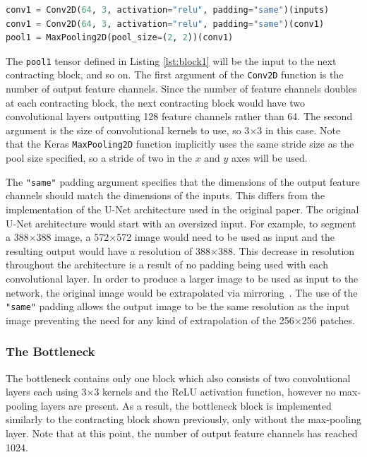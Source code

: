 \begin{lstlisting}[float={!t},caption={IThe implementation of the first contracting block of the U-Net architecture using the Keras functional API.},label={lst:block1},language=Python,upquote=true,belowskip=0pt]
conv1 = Conv2D(64, 3, activation="relu", padding="same")(inputs)
conv1 = Conv2D(64, 3, activation="relu", padding="same")(conv1)
pool1 = MaxPooling2D(pool_size=(2, 2))(conv1)
\end{lstlisting}
The \texttt{pool1} tensor defined in Listing \ref{lst:block1} will be the input to the next contracting block, and so on. The first argument of the \texttt{Conv2D} function is the number of output feature channels. Since the number of feature channels doubles at each contracting block, the next contracting block would have two convolutional layers outputting 128 feature channels rather than 64. The second argument is the size of convolutional kernels to use, so 3$\times$3 in this case. Note that the Keras \texttt{MaxPooling2D} function implicitly uses the same stride size as the pool size specified, so a stride of two in the $x$ and $y$ axes will be used.

The \texttt{"{}same"{}} padding argument specifies that the dimensions of the output feature channels should match the dimensions of the inputs. This differs from the implementation of the U-Net architecture used in the original paper. The original U-Net architecture would start with an oversized input. For example, to segment a 388$\times$388 image, a 572$\times$572 image would need to be used as input and the resulting output would have a resolution of 388$\times$388. This decrease in resolution throughout the architecture is a result of no padding being used with each convolutional layer. In order to produce a larger image to be used as input to the network, the original image would be extrapolated via mirroring~\cite{ronneberger2015u}. The use of the \texttt{"{}same"{}} padding allows the output image to be the same resolution as the input image preventing the need for any kind of extrapolation of the 256$\times$256 patches.

\subsubsection{The Bottleneck}

The bottleneck contains only one block which also consists of two convolutional layers each using 3$\times$3 kernels and the ReLU activation function, however no max-pooling layers are present. As a result, the bottleneck block is implemented similarly to the contracting block shown previously, only without the max-pooling layer. Note that at this point, the number of output feature channels has reached 1024.

